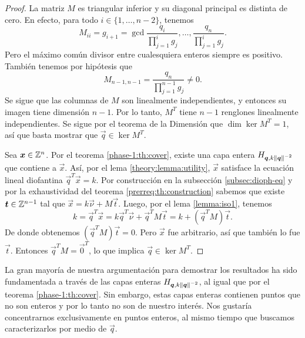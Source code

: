 \begin{proof}
	La matriz $M$ es triangular inferior y su diagonal principal es distinta de cero. En efecto,
	para todo $i \in \lbrace 1, \ldots, n - 2\rbrace$, tenemos
	\begin{equation*}
		M_{ii} = g_{i + 1} = \gcd{\frac{q_i}{\prod_{j=1}^{i}g_j}, \ldots,
		\frac{q_n}{\prod_{j=1}^{i}g_j}}.
	\end{equation*}
	Pero el máximo común divisor entre cualesquiera enteros siempre es positivo. También tenemos por
	hipótesis que
	\begin{equation*}
		M_{n-1, n-1} = \frac{q_n}{\prod_{j=1}^{n-1}g_j} \neq 0.
	\end{equation*}
	Se sigue que las columnas de $M$ son linealmente
	independientes, y entonces su imagen tiene dimensión $n - 1$. Por lo tanto, $M^T$ tiene $n - 1$
	renglones linealmente independientes. Se sigue por el teorema de la Dimensión que $\dim
	\ker{M^T} = 1$, así que basta mostrar que $\vec{q} \in \ker{M^T}$.

	Sea $\boldsymbol{x} \in \mathbb{Z}^n$. Por el teorema \ref{phase-1:th:cover}, existe una capa entera
	$H_{\boldsymbol{q}, k\left\lVert \boldsymbol{q} \right\rVert^{-2}}$ que contiene a $\vec{x}$. Así, por el lema
	\ref{theory:lemma:utility}, $\vec{x}$ satisface la
	ecuación lineal diofantina $\vec{q}^T\vec{x} = k$.
	Por construcción en la subsección
	\ref{subsec:dioph-eq} y por la exhaustividad del teorema \ref{prerreq:th:construction}
	sabemos que existe $\boldsymbol{t} \in \mathbb{Z}^{n-1}$ tal que $\vec{x} = k\vec{\nu} + M\vec{t}$. Luego,
	por el lema \ref{lemma:iso1}, tenemos
	\begin{equation*}
		k = \vec{q}^T\vec{x} = k \vec{q}^T\vec{\nu} + \vec{q}^TM\vec{t} = k +
		(\vec{q}^TM)\vec{t}.
	\end{equation*}
	De donde obtenemos $(\vec{q}^TM)\vec{t} = 0$. Pero $\vec{x}$ fue arbitrario, así que también lo
	fue $\vec{t}$. Entonces $\vec{q}^TM = \vec{0}^T$, lo que implica $\vec{q} \in \ker{M^T}$.
\end{proof}

La gran mayoría de nuestra argumentación para demostrar los resultados ha sido fundamentada a través
de las capas enteras $H_{\boldsymbol{q}, k\left\lVert \boldsymbol{q} \right\rVert^{-2}}$, al igual que por el teorema \ref{phase-1:th:cover}. Sin embargo,
estas capas enteras contienen puntos que no son enteros y por lo tanto no son de nuestro interés.
Nos gustaría concentrarnos exclusivamente en puntos enteros, al mismo tiempo que buscamos
caracterizarlos por medio de $\vec{q}$.



